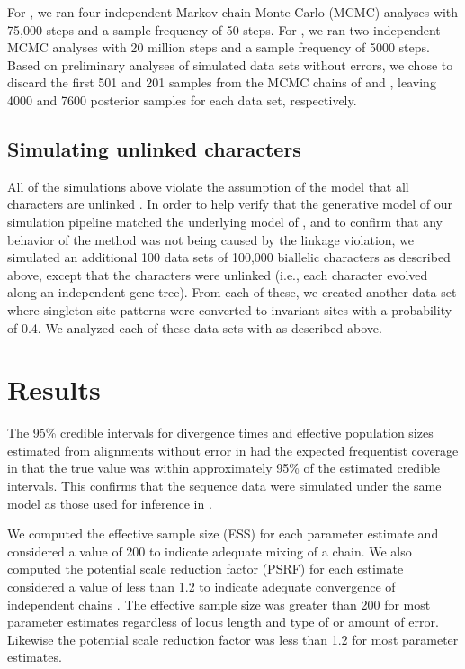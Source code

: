 For \ecoevolity, we ran four independent Markov chain Monte Carlo (MCMC)
analyses with 75,000 steps and a sample frequency of 50 steps.
For \beast, we ran two independent MCMC analyses with 20 million steps and a
sample frequency of 5000 steps. 
Based on preliminary analyses of simulated data sets without errors,
we chose to discard the first 501 and 201 samples from
the MCMC chains of \ecoevolity and \beast, leaving 4000 and
7600 posterior samples for each data set, respectively.


\subsection{Simulating unlinked characters}
All of the simulations above violate the assumption of the \ecoevolity
model that all characters are unlinked
\citep{bryantInferringSpeciesTrees2012,Oaks2018ecoevolity}.
In order to help verify that the generative model of our simulation pipeline
matched the underlying model of \ecoevolity, and to confirm that any behavior
of the method was not being caused by the linkage violation,
we simulated an additional 100 data sets of 100,000 biallelic characters as
described above, except that the characters  were unlinked
(i.e., each character evolved along an independent gene tree).
From each of these, we created another data set where singleton site patterns
were converted to invariant sites with a probability of 0.4.
We analyzed each of these data sets with \ecoevolity as described above.


\section{Results}

The 95\% credible intervals for divergence times and effective population 
sizes estimated from alignments without error in \beast had the expected 
frequentist coverage in that the true value was within approximately 95\% of the 
estimated credible intervals. 
This confirms that the sequence data were simulated under the same model as 
those used for inference in \beast. 

We computed the effective sample size (ESS) for each parameter estimate and considered
a value of 200 to indicate adequate mixing of a chain. 
We also computed the potential scale reduction factor (PSRF) for each estimate 
considered a value of less than 1.2 to indicate adequate convergence of 
independent chains \citep{gelman1998}. 
The effective sample size was greater than 200 for most \ecoevolity parameter
estimates regardless of locus length and type of or amount of error. 
Likewise the potential scale reduction factor was less than 1.2 for most \ecoevolity parameter estimates.


